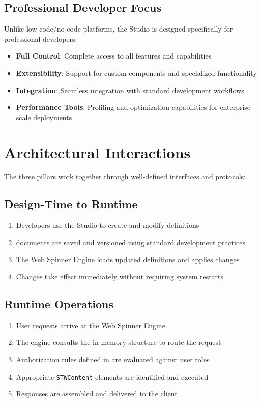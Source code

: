\subsection{Professional Developer Focus}

Unlike low-code/no-code platforms, the Studio is designed specifically for professional developers:

\begin{itemize}
    \item \textbf{Full Control}: Complete access to all \wbdl{} features and capabilities
    \item \textbf{Extensibility}: Support for custom components and specialized functionality
    \item \textbf{Integration}: Seamless integration with standard development workflows
    \item \textbf{Performance Tools}: Profiling and optimization capabilities for enterprise-scale deployments
\end{itemize}

\section{Architectural Interactions}
\label{sec:architectural-interactions}

The three pillars work together through well-defined interfaces and protocols:

\subsection{Design-Time to Runtime}

\begin{enumerate}
    \item Developers use the Studio to create and modify \webbase{} definitions
    \item \wbdl{} documents are saved and versioned using standard development practices
    \item The Web Spinner Engine loads updated \webbase{} definitions and applies changes
    \item Changes take effect immediately without requiring system restarts
\end{enumerate}

\subsection{Runtime Operations}

\begin{enumerate}
    \item User requests arrive at the Web Spinner Engine
    \item The engine consults the in-memory \webbase{} structure to route the request
    \item Authorization rules defined in \wbdl{} are evaluated against user roles
    \item Appropriate \texttt{STWContent} elements are identified and executed
    \item Responses are assembled and delivered to the client
\end{enumerate}

